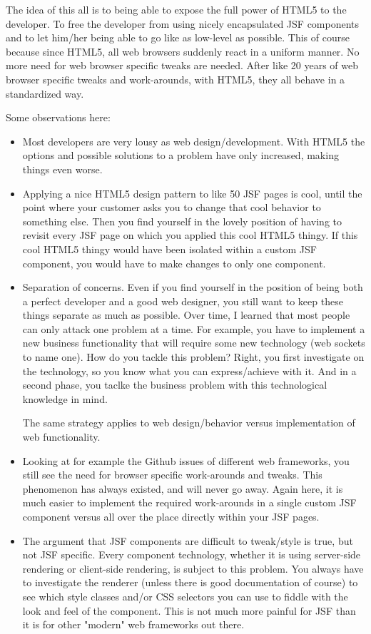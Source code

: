 The idea of this all is to being able to expose the full power of HTML5 to the developer.
To free the developer from using nicely encapsulated JSF components and to let him/her being able to go like as low-level as possible.
This of course because since HTML5, all web browsers suddenly react in a uniform manner.
No more need for web browser specific tweaks are needed.
After like 20 years of web browser specific tweaks and work-arounds, with HTML5, they all behave in a standardized way.

Some observations here:
\begin{itemize}
	\item Most developers are very lousy as web design/development. With HTML5 the options and possible solutions to a problem have only increased, making things even worse.
	\item Applying a nice HTML5 design pattern to like 50 JSF pages is cool, until the point where your customer asks you to change that cool behavior to something else. Then you find yourself in the lovely position of having to revisit every JSF page on which you applied this cool HTML5 thingy.
	If this cool HTML5 thingy would have been isolated within a custom JSF component, you would have to make changes to only one component.
	\item Separation of concerns. Even if you find yourself in the position of being both a perfect developer and a good web designer, you still want to keep these things separate as much as possible.
	Over time, I learned that most people can only attack one problem at a time.
	For example, you have to implement a new business functionality that will require some new technology (web sockets to name one).
	How do you tackle this problem? Right, you first investigate on the technology, so you know what you can express/achieve with it.
	And in a second phase, you taclke the business problem with this technological knowledge in mind.
	
	The same strategy applies to web design/behavior versus implementation of web functionality.
	
	\item Looking at for example the Github issues of different web frameworks,
	you still see the need for browser specific work-arounds and tweaks.
	This phenomenon has always existed, and will never go away.
	Again here, it is much easier to implement the required work-arounds in a single custom JSF component versus all over the place directly within your JSF pages.
	
	\item The argument that JSF components are difficult to tweak/style is true, but not JSF specific.
	Every component technology, whether it is using server-side rendering or client-side rendering,
	is subject to this problem.
	You always have to investigate the renderer (unless there is good documentation of course)
	to see which style classes and/or CSS selectors you can use to fiddle with the look and feel of the component.
	This is not much more painful for JSF than it is for other "modern" web frameworks out there.
\end{itemize}

